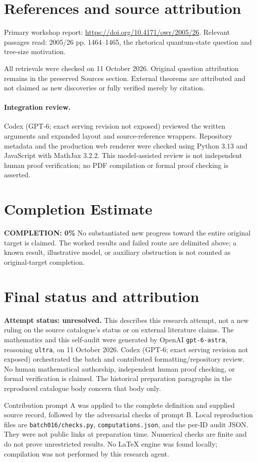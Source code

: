 \documentclass[11pt]{article}
\begin{document}
\section{References and source attribution}
Primary workshop report: \url{https://doi.org/10.4171/owr/2005/26}. Relevant passages read: 2005/26 pp. 1464--1465, the rhetorical quantum-state question and tree-size motivation.

All retrievals were checked on 11 October 2026. Original question attribution remains in the preserved Sources section. External theorems are attributed and not claimed as new discoveries or fully verified merely by citation.


\paragraph{Integration review.} Codex (GPT-6; exact serving revision not exposed) reviewed the written arguments and expanded layout and source-reference wrappers. Repository metadata and the production web renderer were checked using Python 3.13 and JavaScript with MathJax 3.2.2. This model-assisted review is not independent human proof verification; no PDF compilation or formal proof checking is asserted.

\section{Completion Estimate}
\noindent\textbf{COMPLETION: 0\%}
No substantiated new progress toward the entire original target is claimed. The worked results and failed route are delimited above; a known result, illustrative model, or auxiliary obstruction is not counted as original-target completion.

\section{Final status and attribution}
\textbf{Attempt status: unresolved.} This describes this research attempt, not a new ruling on the source catalogue's status or on external literature claims.
The mathematics and this self-audit were generated by OpenAI \texttt{gpt-6-astra}, reasoning \texttt{ultra}, on 11 October 2026. Codex (GPT-6; exact serving revision not exposed) orchestrated the batch and contributed formatting/repository review. No human mathematical authorship, independent human proof checking, or formal verification is claimed. The historical preparation paragraphs in the reproduced catalogue body concern that body only.

Contribution prompt A was applied to the complete definition and supplied source record, followed by the adversarial checks of prompt B. Local reproduction files are \texttt{batch016/checks.py}, \texttt{computations.json}, and the per-ID audit JSON. They were not public links at preparation time. Numerical checks are finite and do not prove unrestricted results. No LaTeX engine was found locally; compilation was not performed by this research agent.
\end{document}
